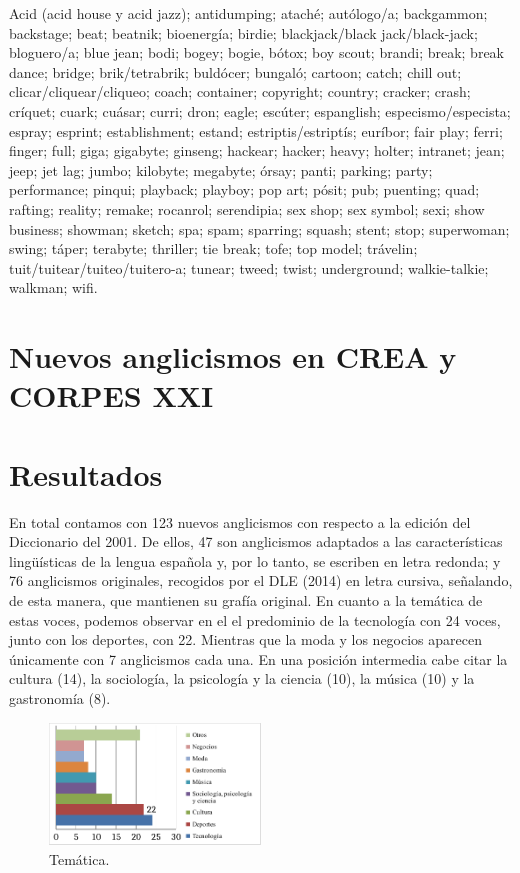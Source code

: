 \documentclass{textolivre}
\begin{document}
Acid (acid house y acid jazz); antidumping; ataché; autólogo/a; backgammon; backstage; beat; beatnik; bioenergía; birdie; blackjack/black jack/black-jack; bloguero/a; blue jean; bodi; bogey; bogie, bótox; boy scout; brandi; break; break dance; bridge; brik/tetrabrik; buldócer; bungaló; cartoon; catch; chill out; clicar/cliquear/cliqueo; coach; container; copyright; country; cracker; crash; críquet; cuark; cuásar; curri; dron; eagle; escúter; espanglish; especismo/especista; espray; esprint; establishment; estand; estriptis/estriptís; euríbor; fair play; ferri; finger; full; giga; gigabyte; ginseng; hackear; hacker; heavy; holter; intranet; jean; jeep; jet lag; jumbo; kilobyte; megabyte; órsay; panti; parking; party; performance; pinqui; playback; playboy; pop art; pósit; pub; puenting; quad; rafting; reality; remake; rocanrol; serendipia; sex shop; sex symbol; sexi; show business; showman; sketch; spa; spam; sparring; squash; stent; stop; superwoman; swing; táper; terabyte; thriller; tie break; tofe; top model; trávelin; tuit/tuitear/tuiteo/tuitero-a; tunear; tweed; twist; underground; walkie-talkie; walkman; wifi.



\section{Nuevos anglicismos en CREA y CORPES XXI}\label{sec-corpes}



\section{Resultados}\label{sec-resultados}
En total contamos con 123 nuevos anglicismos con respecto a la edición del Diccionario del 2001. De ellos, 47 son anglicismos adaptados a las características lingüísticas de la lengua española y, por lo tanto, se escriben en letra redonda; y 76 anglicismos originales, recogidos por el DLE (2014) en letra cursiva, señalando, de esta manera, que mantienen su grafía original. En cuanto a la temática de estas voces, podemos observar en el  el predominio de la tecnología con 24 voces, junto con los deportes, con 22. Mientras que la moda y los negocios aparecen únicamente con 7 anglicismos cada una. En una posición intermedia cabe citar la cultura (14), la sociología, la psicología y la ciencia (10), la música (10) y la gastronomía (8).

\begin{figure}[htbp]
 \centering
 \includegraphics[width=0.5\textwidth]{figure01.pdf}
 \caption{Temática.}
 \label{fig-01}
\end{figure}
\end{document}
